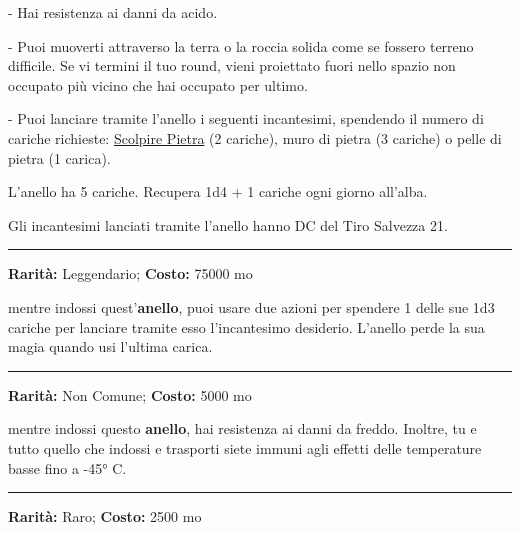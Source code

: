 \begin{multicols}{2}
\smallskip- Hai resistenza ai danni da acido.

\smallskip- Puoi muoverti attraverso la terra o la roccia solida come se fossero terreno difficile. Se vi termini il tuo round, vieni proiettato fuori nello spazio non occupato più vicino che hai occupato per ultimo.

\smallskip- Puoi lanciare tramite l'anello i seguenti incantesimi, spendendo il numero di cariche richieste: \hyperlink{Scolpire Pietra}{Scolpire Pietra} (2 cariche), muro di pietra (3 cariche) o pelle di pietra (1 carica).

\medskip

L'anello ha 5 cariche. Recupera 1d4 + 1 cariche ogni giorno all'alba.

Gli incantesimi lanciati tramite l'anello hanno DC del Tiro Salvezza 21.

\smallskip\noindent\rule{\linewidth}{2pt}  \hypertarget{AnellodeiTreDesideri}{}\smallskip{}\noindent\label{AnellodeiTreDesideri}

\textbf{Rarità:} Leggendario; \textbf{Costo:} 75000 mo

mentre indossi quest'\textbf{anello}, puoi usare due azioni per spendere 1 delle sue 1d3 cariche per lanciare tramite esso l'incantesimo desiderio. L'anello perde la sua magia quando usi l'ultima carica.

\smallskip\noindent\rule{\linewidth}{2pt}  \hypertarget{AnellodelCalore}{}\smallskip{}\noindent\label{AnellodelCalore}

\textbf{Rarità:} Non Comune; \textbf{Costo:} 5000 mo

mentre indossi questo \textbf{anello}, hai resistenza ai danni da freddo. Inoltre, tu e tutto quello che indossi e trasporti siete immuni agli effetti delle temperature basse fino a -45° C.

\smallskip\noindent\rule{\linewidth}{2pt}  \hypertarget{AnellodelControllodellepersone}{}\smallskip{}\noindent\label{AnellodelControllodellepersone}

\textbf{Rarità:} Raro; \textbf{Costo:} 2500 mo


\end{multicols}

